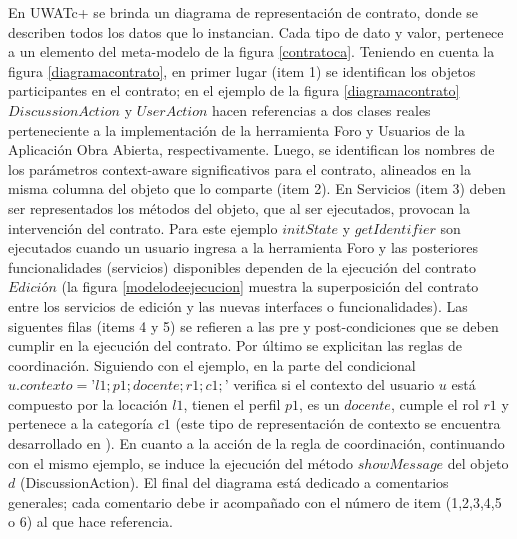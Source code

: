 En UWATc+ se brinda un diagrama de representación de contrato, donde se
describen todos los datos que lo instancian. Cada tipo de dato y valor,
pertenece a un elemento del meta-modelo de la figura \ref{contratoca}. Teniendo
en cuenta la figura \ref{diagramacontrato}, en primer lugar (item 1) se
identifican los objetos participantes en el contrato; en el ejemplo de la figura
\ref{diagramacontrato} $DiscussionAction$ y $UserAction$ hacen referencias a dos
clases reales perteneciente a la implementación de la herramienta Foro y
Usuarios de la Aplicación Obra Abierta, respectivamente. Luego, se identifican
los nombres de los parámetros context-aware significativos para el contrato,
alineados en la misma columna del objeto que lo comparte (item 2). En Servicios
(item 3) deben ser representados los métodos del objeto, que al ser ejecutados,
provocan la intervención del contrato. Para este ejemplo $initState$ y
$getIdentifier$  son ejecutados cuando un usuario ingresa a la herramienta Foro
y las posteriores funcionalidades (servicios) disponibles  dependen de la
ejecución del contrato $Edición$ (la figura \ref{modelodeejecucion} muestra la
superposición del contrato entre los servicios de edición y las nuevas
interfaces o funcionalidades). Las siguentes filas (items 4 y 5) se refieren a
las pre y post-condiciones que se deben cumplir en la ejecución del contrato.
Por último se explicitan las reglas de coordinación. Siguiendo con el ejemplo,
en la parte del condicional $u.contexto=’l1;p1;docente;r1;c1;’$ verifica si el
contexto del usuario $u$ está compuesto por la locación $l1$, tienen el perfil
$p1$, es un $docente$, cumple el rol $r1$ y pertenece a la categoría $c1$ (este
tipo de representación de contexto se encuentra desarrollado en \cite{libro}).
En cuanto a la acción de la regla de coordinación, continuando con el mismo
ejemplo, se induce la ejecución del método $showMessage$ del objeto $d$
(DiscussionAction). El final del diagrama está dedicado a comentarios generales;
cada comentario debe ir acompañado con el número de item (1,2,3,4,5 o 6) al que
hace referencia. 

